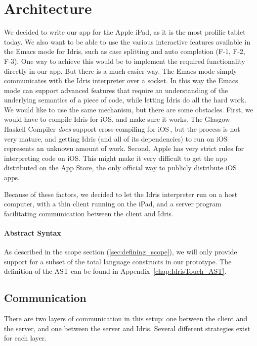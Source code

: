 \chapter{Architecture}
\label{sec:Architecture}

We decided to write our app for the Apple iPad, as it is the most prolific
tablet today. We also want to be able to use the various interactive features
available in the Emacs mode for Idris, such as case
splitting and auto completion (F-1, F-2, F-3). One way to achieve this would be to implement
the required functionality directly in our app. But there is a much easier way.
The Emacs mode simply communicates with the Idris interpreter over a socket. 
In this way the Emacs mode can support advanced features that require an
understanding of the underlying semantics of a piece of code, while letting
Idris do all the hard work. We would like to use the same mechanism, but there
are some obstacles. First, we would have to compile Idris for iOS, and make 
sure it works. The Glasgow Haskell Compiler \emph{does} support 
cross-compiling for iOS\,\cite{ghc_ios_crosscompiler}, but the process is not very mature, and
getting Idris (and all of its dependencies) to run on iOS represents an 
unknown amount of work. Second, Apple has very strict rules for interpreting
code on iOS\@. This might make it very difficult to get the app distributed on
the App Store, the only official way to publicly distribute iOS apps.

Because of these factors, we decided to let the Idris interpreter run on a 
host computer, with a thin client running on the iPad, and a server program 
facilitating communication between the client and Idris.

\subsubsection{Abstract Syntax}
\label{subsec:AbstractSyntax}
As described in the scope section (\ref{sec:defining_scope}), we will only
provide support for a subset of the total language constructs in our prototype.
The definition of the AST can be found in Appendix~\ref{chap:IdrisTouch_AST}.


\section{Communication}
There are two layers of communication in this setup: one between the client and
the server, and one between the server and Idris. Several different strategies
exist for each layer. 

